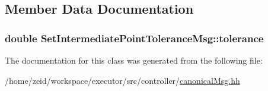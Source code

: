 \subsection{Member Data Documentation}
\hypertarget{class_set_intermediate_point_tolerance_msg_a27dcb08ae7b05b2cb73f1334b4748c20}{
\subsubsection[{tolerance}]{\setlength{\rightskip}{0pt plus 5cm}double {\bf SetIntermediatePointToleranceMsg::tolerance}}}
\label{class_set_intermediate_point_tolerance_msg_a27dcb08ae7b05b2cb73f1334b4748c20}


The documentation for this class was generated from the following file:\begin{DoxyCompactItemize}
\item 
/home/zeid/workspace/executor/src/controller/\hyperlink{canonical_msg_8hh}{canonicalMsg.hh}\end{DoxyCompactItemize}
